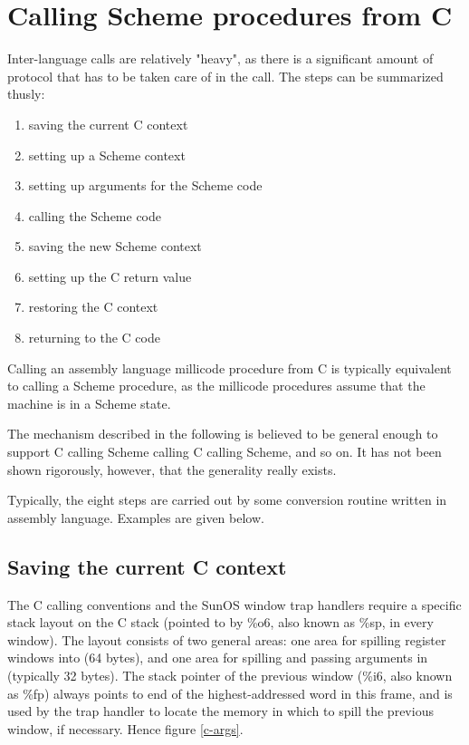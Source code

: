 \section{Calling Scheme procedures from C}

Inter-language calls are relatively "heavy", as there is a significant
amount of protocol that has to be taken care of in the call. The steps can
be summarized thusly:

\begin{enumerate}
\item saving the current C context
\item setting up a Scheme context
\item setting up arguments for the Scheme code
\item calling the Scheme code
\item saving the new Scheme context
\item setting up the C return value
\item restoring the C context
\item returning to the C code
\end{enumerate}

Calling an assembly language millicode procedure from C is typically
equivalent to calling a Scheme procedure, as the millicode procedures
assume that the machine is in a Scheme state.

The mechanism described in the following is believed to be general enough
to support C calling Scheme calling C calling Scheme, and so on. It has
not been shown rigorously, however, that the generality really exists.

Typically, the eight steps are carried out by some conversion routine
written in assembly language. Examples are given below.

\subsection{Saving the current C context}

The C calling conventions and the SunOS window trap handlers require a
specific stack layout on the C stack (pointed to by \%o6, also known as
\%sp, in every window). The layout consists of two general areas: one
area for spilling register windows into (64 bytes), and one area for
spilling and passing arguments in (typically 32 bytes). The stack
pointer of the previous window (\%i6, also known as \%fp) always points
to end of the highest-addressed word in this frame, and is used by
the trap handler to locate the memory in which to spill the previous
window, if necessary. Hence figure \ref{c-args}.

